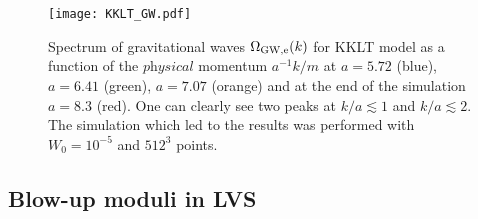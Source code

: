 \documentclass[12pt]{article}
\begin{document}
\begin{figure}
\begin{center}\texttt{[image: KKLT\_GW.pdf]}
\end{center}
\caption{Spectrum of gravitational waves $\Omega_{\rm GW,\rm e}(k)$ for KKLT model as a function of the $\textit{physical}$ momentum $a^{-1}k/m$ at $a=5.72$ (blue), $a=6.41$  (green), $a=7.07$ (orange) and at the end of the simulation $a=8.3$ (red). One can clearly see two peaks at $k/a \lesssim 1$ and $k/a \lesssim 2$. The simulation which led to the results was performed with $W_0=10^{-5}$ and $512^3$ points.}
\label{fig:KKLT_GW_1e-5}
\end{figure}


\subsection{Blow-up moduli in LVS}
\label{sec:KMI}
\end{document}
